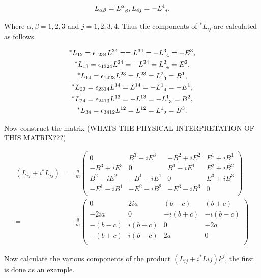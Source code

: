\begin{eqnarray*}
L_{\alpha \beta} = \tensor{L}{^\alpha_\beta},
L_{4 j} = - \tensor{L}{^4_j}.
\end{eqnarray*}

\noindent Where $\alpha,\beta = 1,2,3$ and $j = 1,2,3,4$. Thus the components of $^*L_{ij}$ are calculated as follows

\begin{gather*}
^*L_{12} = \epsilon_{1234}L^{34} = = L^{34} = -\tensor{L}{^3_4} = -E^3, \\
^*L_{13} = \epsilon_{1324}L^{24} = - L^{24} = \tensor{L}{^2_4} = E^2,  \\
^*L_{14} = \epsilon_{1423}L^{23} = L^{23} = \tensor{L}{^2_3} =  B^1, \\
^*L_{23} = \epsilon_{2314}L^{14} = L^{14} = -\tensor{L}{^1_4} = -E^1, \\
^*L_{24} = \epsilon_{2413}L^{13} = -L^{13} =- \tensor{L}{^1_3} =  B^2,\\
^*L_{34} = \epsilon_{3412}L^{12} = L^{12} = \tensor{L}{^1_2} = B^3. \\
\end{gather*}

\noindent Now construct the matrix (WHATS THE PHYSICAL INTERPRETATION OF THIS MATRIX???)

\begin{eqnarray*}
(L_{ij} + i ^*L_{ij}) = &
\frac{q}{m}
\left(
\begin{array}{cccc}
0           & B^3 - iE^3 & -B^2 + i E^2 & E^1 +iB^1 \\
-B^3+iE^3   & 0          & B^1 - i E^1  & E^2+iB^2 \\
B^2-iE^2    & -B^1 +iE^1 & 0            & E^3+iB^3 \\
-E^1 - iB^1 & -E^2-iB^2  & -E^3-iB^3    & 0        \\
\end{array}
\right) \\
= & 
\frac{q}{m}
\left(
\begin{array}{cccc}
0      & 2ia    & (b-c)   & (b+c)   \\
-2ia   & 0      & -i(b+c) & -i(b-c) \\
-(b-c) & i(b+c) & 0       & -2a     \\
-(b+c) & i(b-c) & 2a      & 0       \\
\end{array}
\right)
\end{eqnarray*}

\noindent Now calculate the various components of the product $(L_{ij} + i ^*L{ij}) k^j$, the first is done as an example. 

